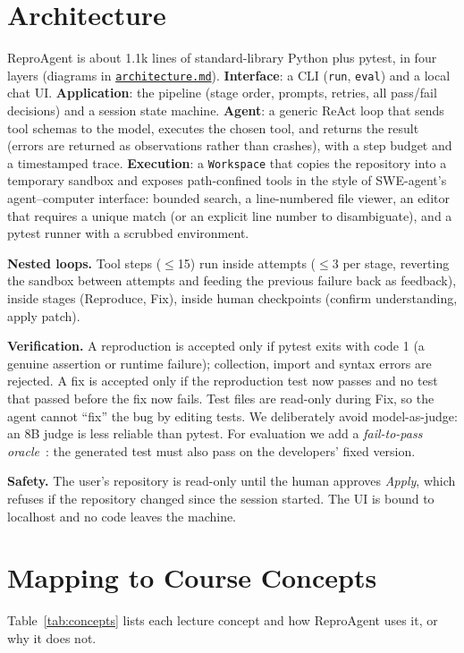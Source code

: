 \documentclass[manuscript,screen,nonacm]{acmart}
\newcommand{\repo}{https://github.com/keshavdubeyy/reproagent_autose}
\newcommand{\rlink}[2]{\href{\repo/blob/main/#1}{#2}}
\begin{document}
\section{Architecture}
ReproAgent is about 1.1k lines of standard-library Python plus pytest, in four layers (diagrams in \rlink{docs/architecture.md}{\texttt{architecture.md}}).
\textbf{Interface}: a CLI (\texttt{run}, \texttt{eval}) and a local chat UI.
\textbf{Application}: the pipeline (stage order, prompts, retries, all pass/fail decisions) and a session state machine.
\textbf{Agent}: a generic ReAct loop that sends tool schemas to the model, executes the chosen tool, and returns the result
(errors are returned as observations rather than crashes), with a step budget and a timestamped trace.
\textbf{Execution}: a \texttt{Workspace} that copies the repository into a temporary sandbox and exposes path-confined tools
in the style of SWE-agent's agent--computer interface: bounded search, a line-numbered file viewer, an editor that requires a unique match
(or an explicit line number to disambiguate), and a pytest runner with a scrubbed environment.

\textbf{Nested loops.} Tool steps ($\le$15) run inside attempts ($\le$3 per stage, reverting the sandbox between attempts and feeding
the previous failure back as feedback), inside stages (Reproduce, Fix), inside human checkpoints (confirm understanding, apply patch).

\textbf{Verification.} A reproduction is accepted only if pytest exits with code 1 (a genuine assertion or runtime failure);
collection, import and syntax errors are rejected. A fix is accepted only if the reproduction test now passes and no test that passed
before the fix now fails. Test files are read-only during Fix, so the agent cannot ``fix'' the bug by editing tests.
We deliberately avoid model-as-judge: an 8B judge is less reliable than pytest.
For evaluation we add a \emph{fail-to-pass oracle}~\cite{swtbench}: the generated test must also pass on the developers' fixed version.

\textbf{Safety.} The user's repository is read-only until the human approves \emph{Apply}, which refuses if the repository changed
since the session started. The UI is bound to localhost and no code leaves the machine.

\section{Mapping to Course Concepts}\label{sec:concepts}
Table~\ref{tab:concepts} lists each lecture concept and how ReproAgent uses it, or why it does not.
\end{document}

